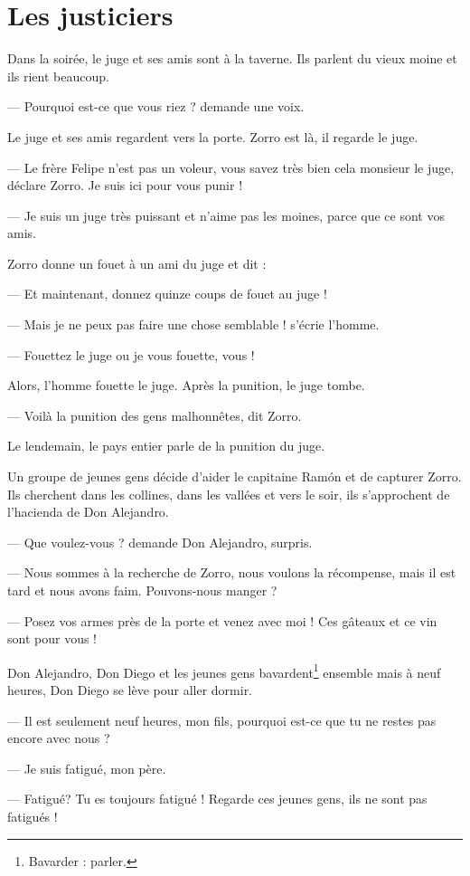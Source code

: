 \chapter{Les justiciers}
Dans la soirée, le juge et ses amis sont à la taverne. Ils parlent du vieux moine et ils rient beaucoup.

--- Pourquoi est-ce que vous riez ? demande une voix.

Le juge et ses amis regardent vers la porte. Zorro est là, il regarde le juge.

--- Le frère Felipe n'est pas un voleur, vous savez très bien cela monsieur le juge, déclare Zorro. Je suis ici pour vous punir !

--- Je suis un juge très puissant et n'aime pas les moines, parce que ce sont vos amis.

Zorro donne un fouet à un ami du juge et dit :

--- Et maintenant, donnez quinze coups de fouet au juge !

--- Mais je ne peux pas faire une chose semblable ! s'écrie l'homme.

--- Fouettez le juge ou je vous fouette, vous !

Alors, l'homme fouette le juge. Après la punition, le juge tombe.

--- Voilà la punition des gens malhonnêtes, dit Zorro.

Le lendemain, le pays entier parle de la punition du juge.

Un groupe de jeunes gens décide d'aider le capitaine Ramón et de capturer Zorro. Ils cherchent dans les collines, dans les vallées
et vers le soir, ils s'approchent de l'hacienda de Don Alejandro.

--- Que voulez-vous ? demande Don Alejandro, surpris.

--- Nous sommes à la recherche de Zorro, nous voulons la récompense, mais il est tard et nous avons faim. Pouvons-nous manger ?

--- Posez vos armes près de la porte et venez avec moi ! Ces gâteaux et ce vin sont pour vous !

Don Alejandro, Don Diego et les jeunes gens bavardent\footnote{Bavarder : parler.} ensemble mais à neuf heures, Don Diego se lève
pour aller dormir.

--- Il est seulement neuf heures, mon fils, pourquoi est-ce que tu ne restes pas encore avec nous ?

--- Je suis fatigué, mon père.

--- Fatigué? Tu es toujours fatigué ! Regarde ces jeunes gens, ils ne sont pas fatigués !

